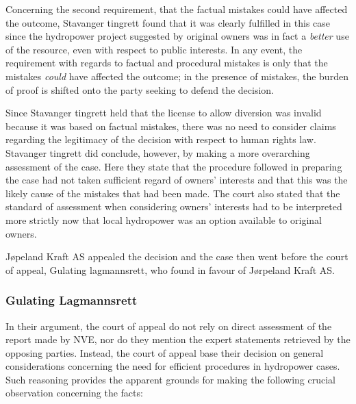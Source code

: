 Concerning the second requirement, that the factual mistakes could have affected the outcome, Stavanger tingrett found that it was clearly fulfilled in this case since the hydropower project suggested by original owners was in fact a \emph{better} use of the resource, even with respect to public interests. In any event, the requirement with regards to factual and procedural mistakes is only that the mistakes \emph{could} have affected the outcome; in the presence of mistakes, the burden of proof is shifted onto the party seeking to defend the decision.

Since Stavanger tingrett held that the license to allow diversion was invalid because it was based on factual mistakes, there was no need to consider claims regarding the legitimacy of the decision with respect to human rights law. Stavanger tingrett did conclude, however, by making a more overarching assessment of the case. Here they state that the procedure followed in preparing the case had not taken sufficient regard of owners' interests and that this was the likely cause of the mistakes that had been made. The court also stated that the standard of assessment when considering owners' interests had to be interpreted more strictly now that local hydropower was an option available to original owners.


Jøpeland Kraft AS appealed the decision and the case then went before the court of appeal, Gulating lagmannsrett, who found in favour of Jørpeland Kraft AS. 

\subsubsection{Gulating Lagmannsrett}

In their argument, the court of appeal do not rely on direct assessment of the report made by NVE, nor do they mention the expert statements retrieved by the opposing parties. Instead, the court of appeal base their decision on general considerations concerning the need for efficient procedures in hydropower cases. Such reasoning provides the apparent grounds for making the following crucial observation concerning the facts:

